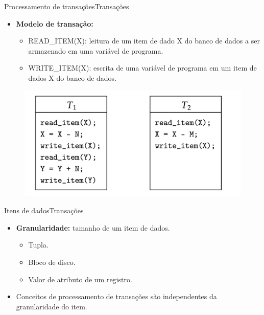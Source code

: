 \documentclass[t]{beamer}
\begin{document}
\begin{ftst}{Processamento de transações}{Transações}

\begin{itemize}
    \item \textbf{Modelo de transação:} 
    \vone
    \begin{itemize}
        \item READ\_ITEM(X): leitura de um item de dado X do banco de dados a ser armazenado em uma variável de programa.
        \item WRITE\_ITEM(X): escrita de uma variável de programa em um item de dados X do banco de dados.
    \end{itemize}
\end{itemize}
    \begin{figure}
        \centering
        \includegraphics[scale=0.17]{Figuras_transacoes/3.png}
    \end{figure}
\end{ftst}


\begin{ftst}{Itens de dados}{Transações}

\begin{itemize}
    \item \textbf{Granularidade:} tamanho de um item de dados. 
    \begin{itemize}
        \item Tupla.
        \item Bloco de disco.
        \item Valor de atributo de um registro.
    \end{itemize}
    \vone
    \item Conceitos de processamento de transações são independentes da granularidade do item.
\end{itemize}

\end{ftst}
\end{document}
